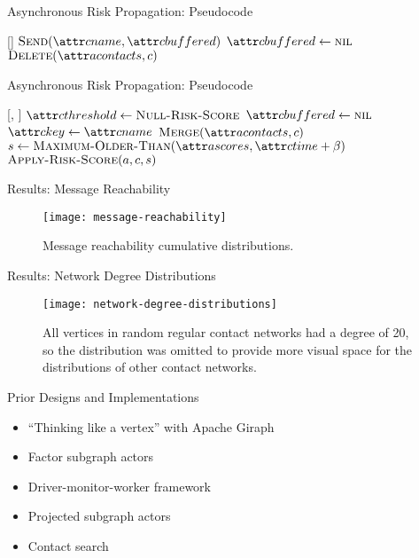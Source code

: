 \documentclass[11pt]{beamer}
\begin{document}
\begin{frame}{Asynchronous Risk Propagation: Pseudocode}
\begin{function}{\nHandleFlushTimeout}[\vActor]
  \ForEach{$\vContact \in \aActorContacts$}
    \If{$\aContactBuffered \notEquals \nil$}
      \State $\cSend[\aContactName, \aContactBuffered]$
      \State $\aContactBuffered \assign \nil$
    \EndIf
      \State $\cDelete[\aActorContacts, \vContact]$
    \EndIf
  \EndFor
\end{function}
\end{frame}

\begin{frame}{Asynchronous Risk Propagation: Pseudocode}
\begin{function}{\nHandleContact}[\vActor, \vContact]
    \State $\aContactThreshold \assign \cNullRiskScore$
    \State $\aContactBuffered \assign \nil$
    \State $\aContactKey \assign \aContactName$
    \State $\cMerge[\aActorContacts, \vContact]$
    \State $\vScore \assign \cMaximumOlderThan[\aActorScores, \aContactTime + \pTimeBuffer]$
    \State $\cApplyRiskScore[\vActor, \vContact, \vScore]$
  \EndIf
\end{function}
\end{frame}

\begin{frame}{Results: Message Reachability}
\begin{figure}
  \centering
  \texttt{[image: message-reachability]}
  \caption[Message reachability cumulative distributions]{Message reachability cumulative distributions.}
\end{figure}
\end{frame}

\begin{frame}{Results: Network Degree Distributions}
\begin{figure}
  \centering
  \texttt{[image: network-degree-distributions]}
  \caption[Contact network degree distributions]{All vertices in random regular contact networks had a degree of 20, so the distribution was omitted to provide more visual space for the distributions of other contact networks.}
\end{figure}
\end{frame}


\begin{frame}{Prior Designs and Implementations}
\begin{itemize}
  \item  ``Thinking like a vertex'' with Apache Giraph
  \item Factor subgraph actors
  \item Driver-monitor-worker framework
  \item Projected subgraph actors \citep{Tatton2022b}
  \item Contact search
\end{itemize}
\end{frame}
\end{document}
